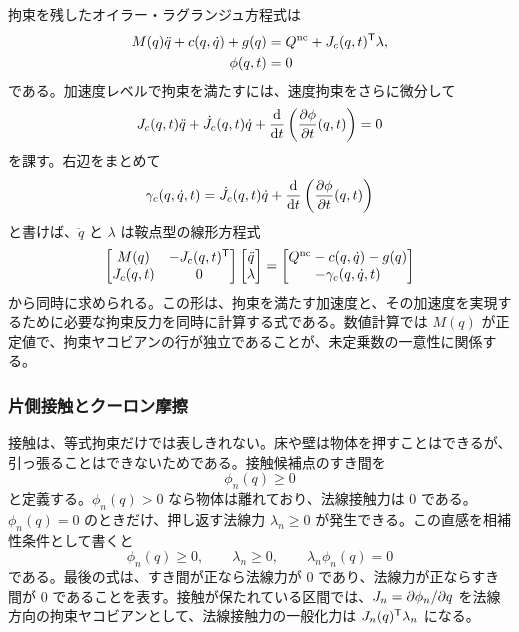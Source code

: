 拘束を残したオイラー・ラグランジュ方程式は
\begin{align}
  M(q)\ddot{q}+c(q,\dot{q})+g(q)
  &=Q^\mathrm{nc}+J_c(q,t)^{\mathsf{T}}\lambda,\\
  \phi(q,t)&=0
\end{align}
である。加速度レベルで拘束を満たすには、速度拘束をさらに微分して
\begin{equation}
  J_c(q,t)\ddot{q}
  +\dot{J}_c(q,t)\dot{q}
  +\frac{\mathrm{d}}{\mathrm{d} t}
    \left(\frac{\partial \phi}{\partial t}(q,t)\right)
  =0
\end{equation}
を課す。右辺をまとめて
\begin{equation}
  \gamma_c(q,\dot{q},t)
  =
  \dot{J}_c(q,t)\dot{q}
  +\frac{\mathrm{d}}{\mathrm{d} t}
    \left(\frac{\partial \phi}{\partial t}(q,t)\right)
\end{equation}
と書けば、$\ddot{q}$ と $\lambda$ は鞍点型の線形方程式
\begin{equation}
  \begin{bmatrix}
    M(q)&-J_c(q,t)^{\mathsf{T}}\\
    J_c(q,t)&0
  \end{bmatrix}
  \begin{bmatrix}
    \ddot{q}\\
    \lambda
  \end{bmatrix}
  =
  \begin{bmatrix}
    Q^\mathrm{nc}-c(q,\dot{q})-g(q)\\
    -\gamma_c(q,\dot{q},t)
  \end{bmatrix}
\end{equation}
から同時に求められる。この形は、拘束を満たす加速度と、その加速度を実現するために必要な拘束反力を同時に計算する式である。数値計算では $M(q)$ が正定値で、拘束ヤコビアンの行が独立であることが、未定乗数の一意性に関係する。

\subsubsection{片側接触とクーロン摩擦}

接触は、等式拘束だけでは表しきれない。床や壁は物体を押すことはできるが、引っ張ることはできないためである。接触候補点のすき間を
\begin{equation}
  \phi_n(q)\ge0
\end{equation}
と定義する。$\phi_n(q)>0$ なら物体は離れており、法線接触力は 0 である。$\phi_n(q)=0$ のときだけ、押し返す法線力 $\lambda_n\ge0$ が発生できる。この直感を相補性条件として書くと
\begin{equation}
  \phi_n(q)\ge0,\qquad
  \lambda_n\ge0,\qquad
  \lambda_n\phi_n(q)=0
\end{equation}
である。最後の式は、すき間が正なら法線力が 0 であり、法線力が正ならすき間が 0 であることを表す。接触が保たれている区間では、$J_n=\partial\phi_n/\partial q$ を法線方向の拘束ヤコビアンとして、法線接触力の一般化力は $J_n(q)^{\mathsf{T}}\lambda_n$ になる。

